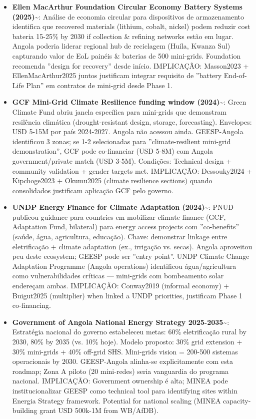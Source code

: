\documentclass[12pt, a4paper]{article}
\begin{document}
\begin{itemize}
  \item \textbf{Ellen MacArthur Foundation Circular Economy Battery Systems (2025)}\textasciitilde{}\citep{EllenMacArthur2025}: Análise de economia circular para dispositivos de armazenamento identifica que recovered materials (lithium, cobalt, nickel) podem reduzir cost bateria 15-25\% by 2030 if collection \& refining networks estão em lugar. Angola poderia liderar regional hub de reciclagem (Huíla, Kwanza Sul) capturando valor de EoL painéis \& baterias de 500 mini-grids. Foundation recomenda ''design for recovery'' desde início. IMPLICAÇÃO: Masson2023 + EllenMacArthur2025 juntos justificam integrar requisito de ''battery End-of-Life Plan'' em contratos de mini-grid desde Phase 1.
  
  \item \textbf{GCF Mini-Grid Climate Resilience funding window (2024)}\textasciitilde{}\citep{GCF2024}: Green Climate Fund abriu janela específica para mini-grids que demonstram resilência climática (drought-resistant design, storage, forecasting). Envelopes: USD 5-15M por país 2024-2027. Angola não acessou ainda. GEESP-Angola identificou 3 zonas; se 1-2 selecionadas para ''climate-resilient mini-grid demonstration'', GCF pode co-financiar (USD 5-8M) com Angola government/private match (USD 3-5M). Condições: Technical design + community validation + gender targets met. IMPLICAÇÃO: Dessouky2024 + Kipchoge2023 + Okumu2025 (climate resilience sections) quando consolidados justificam aplicação GCF pelo governo.
  
  \item \textbf{UNDP Energy Finance for Climate Adaptation (2024)}\textasciitilde{}\citep{UNDP2024}: PNUD publicou guidance para countries em mobilizar climate finance (GCF, Adaptation Fund, bilateral) para energy access projects com ''co-benefits'' (saúde, água, agricultura, educação). Chave: demonstrar linkage entre eletrificação + climate adaptation (ex., irrigação vs. secas). Angola aproveitou peu deste ecosystem; GEESP pode ser ''entry point''. UNDP Climate Change Adaptation Programme (Angola operations) identificou água/agricultura como vulnerabilidades críticas — mini-grids com bombeamento solar endereçam ambas. IMPLICAÇÃO: Conway2019 (informal economy) + Buigut2025 (multiplier) when linked a UNDP priorities, justificam Phase 1 co-financing.
  
  \item \textbf{Government of Angola National Energy Strategy 2025-2035}\textasciitilde{}\citep{Angola2025}: Estratégia nacional do governo estabeleceu metas: 60\% eletrificação rural by 2030, 80\% by 2035 (vs. 10\% hoje). Modelo proposto: 30\% grid extension + 30\% mini-grids + 40\% off-grid SHS. Mini-grids vision = 200-500 sistemas operacionais by 2030. GEESP-Angola alinha-se explicitamente com esta roadmap; Zona A piloto (20 mini-redes) seria vanguardia do programa nacional. IMPLICAÇÃO: Government ownership é alta; MINEA pode institucionalizar GEESP como technical tool para identifying sites within Energia Strategy framework. Potential for national scaling (MINEA capacity-building grant USD 500k-1M from WB/AfDB).
  

\end{itemize}
\end{document}
